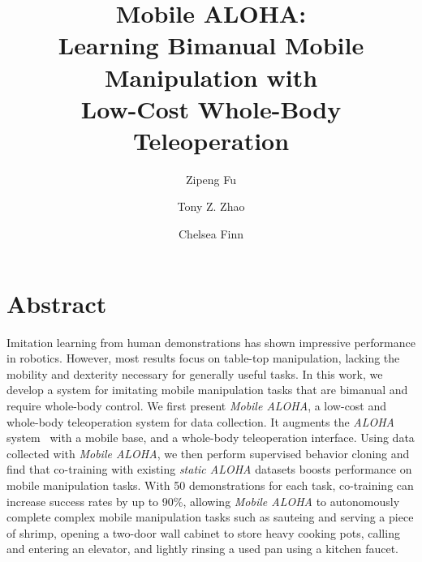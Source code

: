 \documentclass[11pt, a4paper, logo, twocolumn]{stanford}
\title{Mobile ALOHA:\\
\Large{Learning Bimanual Mobile Manipulation with\\Low-Cost Whole-Body Teleoperation}}
\author[*1]{Zipeng Fu}
\author[*1]{Tony Z. Zhao}
\author[1]{Chelsea Finn}
\affil[*]{project co-leads}
\affil[1]{Stanford University}
\newcommand{\method}{\textit{Mobile ALOHA} }
\newcommand{\methodcomma}{\textit{Mobile ALOHA}}
\newcommand{\aloha}{\textit{ALOHA} }
\newcommand{\staticaloha}{\textit{static ALOHA} }
\begin{document}
\maketitle


\section*{\centering Abstract}
Imitation learning from human demonstrations has shown impressive performance in robotics. However, most results focus on table-top manipulation, lacking the mobility and dexterity necessary for generally useful tasks.
In this work, we develop a system for imitating mobile manipulation tasks that are bimanual and require whole-body control.
We first present \methodcomma, a low-cost and whole-body teleoperation system for data collection. It augments the \aloha system~\cite{zhao2023learning} with a mobile base, and a whole-body teleoperation interface.
Using data collected with \methodcomma, we then perform supervised behavior cloning and find that co-training with existing \staticaloha datasets boosts performance on mobile manipulation tasks.
With 50 demonstrations for each task, co-training can increase success rates by up to 90\%, allowing \method to autonomously complete complex mobile manipulation tasks such as sauteing and serving a piece of shrimp,
opening a two-door wall cabinet to store heavy cooking pots, calling and entering an elevator,
and lightly rinsing a used pan using a kitchen faucet.
\end{document}
